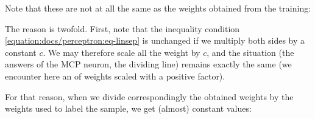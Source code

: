 \documentclass[letterpaper,10pt,english]{jupyterBook}
\begin{document}
\begin{sphinxVerbatim}[commandchars=\\\{\}]
\PYG{p}{[}\PYG{p}{]} 
\end{sphinxVerbatim}

\begin{sphinxVerbatim}
\end{sphinxVerbatim}

\sphinxAtStartPar
Note that these are not at all the same as the weights obtained from the training:

\begin{sphinxVerbatim}[commandchars=\\\{\}]
\end{sphinxVerbatim}

\begin{sphinxVerbatim}
\end{sphinxVerbatim}

\sphinxAtStartPar
The reason is twofold. First, note that the inequality condition \eqref{equation:docs/perceptron:eq-linsep} is unchanged if we multiply both sides by a  constant \(c\). We may therefore scale all the weight by \(c\), and the situation (the answers of the MCP neuron, the dividing line) remains exactly the same (we encounter here an  of weights scaled with a positive factor).

\sphinxAtStartPar
For that reason, when we divide correspondingly the obtained weights by the weights used to label the sample, we get (almost) constant values:

\begin{sphinxVerbatim}[commandchars=\\\{\}]
\end{sphinxVerbatim}
\end{document}
